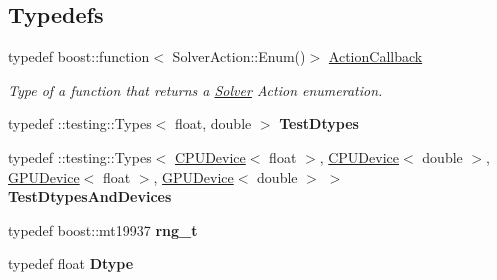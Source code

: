 \subsection*{Typedefs}
\begin{DoxyCompactItemize}
\item 
\mbox{\label{namespacecaffe_a117e25cc445c0d716517761a0fbc6daf}} 
typedef boost\+::function$<$ Solver\+Action\+::\+Enum()$>$ \mbox{\hyperlink{namespacecaffe_a117e25cc445c0d716517761a0fbc6daf}{Action\+Callback}}
\begin{DoxyCompactList}\small\item\em Type of a function that returns a \mbox{\hyperlink{classcaffe_1_1_solver}{Solver}} Action enumeration. \end{DoxyCompactList}\item 
\mbox{\label{namespacecaffe_a29bc40d96f5b8bf0b870ff93001f8d01}} 
typedef \+::testing\+::\+Types$<$ float, double $>$ {\bfseries Test\+Dtypes}
\item 
\mbox{\label{namespacecaffe_a40d05ab79ed59960f69e57cf022be3e2}} 
typedef \+::testing\+::\+Types$<$ \mbox{\hyperlink{structcaffe_1_1_c_p_u_device}{C\+P\+U\+Device}}$<$ float $>$, \mbox{\hyperlink{structcaffe_1_1_c_p_u_device}{C\+P\+U\+Device}}$<$ double $>$, \mbox{\hyperlink{structcaffe_1_1_g_p_u_device}{G\+P\+U\+Device}}$<$ float $>$, \mbox{\hyperlink{structcaffe_1_1_g_p_u_device}{G\+P\+U\+Device}}$<$ double $>$ $>$ {\bfseries Test\+Dtypes\+And\+Devices}
\item 
\mbox{\label{namespacecaffe_aeff0d41eefd30caf64b0c9d03e142af3}} 
typedef boost\+::mt19937 {\bfseries rng\+\_\+t}
\item 
\mbox{\label{namespacecaffe_a52ec2d67a1a8e4901b62e1e63a16988d}} 
typedef float {\bfseries Dtype}
\end{DoxyCompactItemize}
